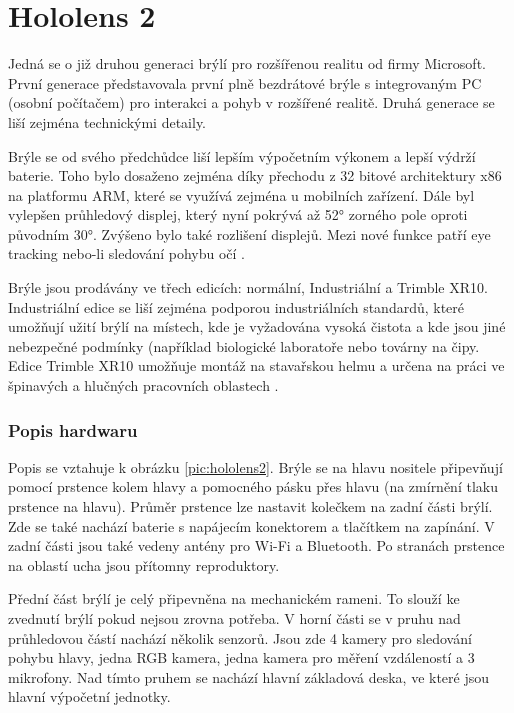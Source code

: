 \section{Hololens 2} \label{sec:Hololens}
Jedná se o již druhou generaci brýlí pro rozšířenou realitu od firmy Microsoft. První generace představovala  první plně bezdrátové brýle s integrovaným  PC (osobní počítačem) pro interakci a pohyb v rozšířené realitě. Druhá generace se liší zejména technickými detaily.

Brýle se od svého předchůdce liší lepším výpočetním výkonem a lepší výdrží baterie. Toho bylo dosaženo zejména díky přechodu z 32 bitové architektury x86 na platformu ARM, které se využívá zejména u mobilních zařízení. Dále byl vylepšen průhledový displej, který nyní pokrývá až 52° zorného pole oproti původním 30°. Zvýšeno bylo také rozlišení displejů. Mezi nové funkce patří eye tracking nebo-li sledování pohybu očí \cite{hololens1/2difrences}.

Brýle jsou prodávány ve třech edicích: normální, Industriální a Trimble XR10. Industriální edice se liší zejména podporou industriálních standardů, které umožňují užití brýlí na místech, kde je vyžadována vysoká čistota a kde jsou jiné nebezpečné podmínky (například biologické laboratoře nebo továrny na čipy. Edice Trimble XR10 umožňuje montáž na stavařskou helmu a určena na práci ve špinavých a hlučných pracovních oblastech \cite{hololens2msOptions}.

\subsubsection{Popis hardwaru}
Popis se vztahuje k obrázku \ref{pic:hololens2}. Brýle se na hlavu nositele připevňují pomocí prstence kolem hlavy a pomocného pásku přes hlavu (na zmírnění tlaku prstence na hlavu). Průměr prstence lze nastavit kolečkem na zadní části brýlí. Zde se také nachází baterie s napájecím konektorem a tlačítkem na zapínání. V zadní části jsou také vedeny antény pro Wi-Fi a Bluetooth. Po stranách prstence na oblastí ucha jsou přítomny reproduktory. 

Přední část brýlí je celý připevněna na mechanickém rameni. To slouží ke zvednutí brýlí pokud nejsou zrovna potřeba. V horní části se v pruhu nad průhledovou částí nachází několik senzorů. Jsou zde 4 kamery pro sledování pohybu hlavy, jedna RGB kamera, jedna kamera pro měření vzdáleností a 3 mikrofony. Nad tímto pruhem se nachází hlavní základová deska, ve které jsou hlavní výpočetní jednotky.

